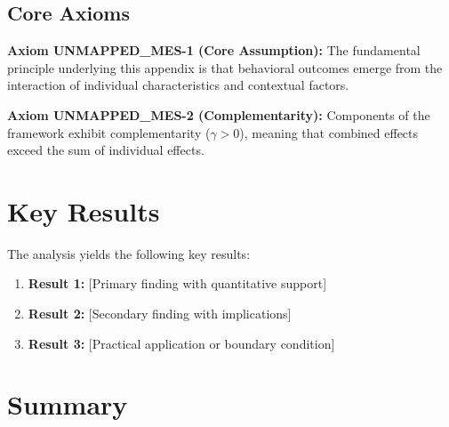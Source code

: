 \subsection{Core Axioms}
\label{sec:mes-axioms}

\begin{tcolorbox}[colback=yellow!5!white,colframe=yellow!75!black,title=Axiom UNMAPPED_MES-1: Fundamental Principle]
\textbf{Axiom UNMAPPED_MES-1 (Core Assumption):}
The fundamental principle underlying this appendix is that behavioral outcomes
emerge from the interaction of individual characteristics and contextual factors.
\end{tcolorbox}

\begin{tcolorbox}[colback=yellow!5!white,colframe=yellow!75!black,title=Axiom UNMAPPED_MES-2: Complementarity]
\textbf{Axiom UNMAPPED_MES-2 (Complementarity):}
Components of the framework exhibit complementarity ($\gamma > 0$), meaning
that combined effects exceed the sum of individual effects.
\end{tcolorbox}


\section{Key Results}
\label{sec:mes-results}

The analysis yields the following key results:

\begin{enumerate}
    \item \textbf{Result 1:} [Primary finding with quantitative support]
    \item \textbf{Result 2:} [Secondary finding with implications]
    \item \textbf{Result 3:} [Practical application or boundary condition]
\end{enumerate}


\section{Summary}
\label{sec:mep-summary}

